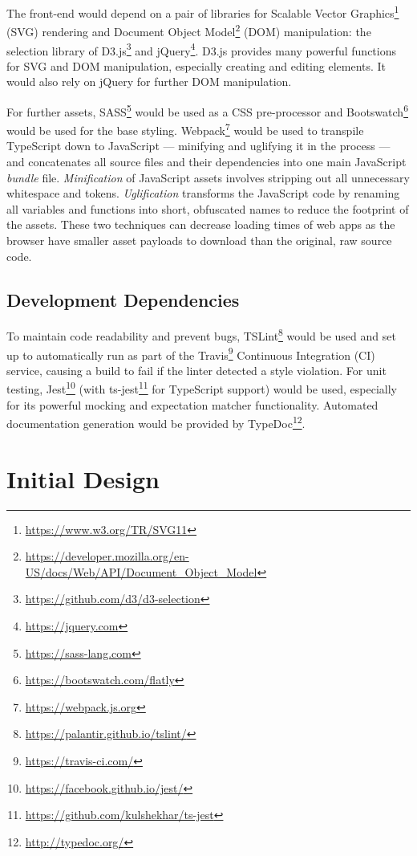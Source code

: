\documentclass[nobib, a4paper, twoside, justified]{tufte-book}
\newcommand{\footnoteurl}[1]{\footnote{\url{#1}}}
\begin{document}
The front-end would depend on a pair of libraries for Scalable Vector
Graphics\footnoteurl{https://www.w3.org/TR/SVG11} (SVG) rendering and Document Object
Model\footnoteurl{https://developer.mozilla.org/en-US/docs/Web/API/Document_Object_Model} (DOM)
manipulation: the selection library of D3.js\footnoteurl{https://github.com/d3/d3-selection} and
jQuery\footnoteurl{https://jquery.com}. D3.js provides many powerful functions for SVG and DOM
manipulation, especially creating and editing elements. It would also rely on jQuery for further
DOM manipulation.

For further assets, SASS\footnoteurl{https://sass-lang.com} would be used as a CSS pre-processor
and Bootswatch\footnoteurl{https://bootswatch.com/flatly} would be used for the base styling.
Webpack\footnoteurl{https://webpack.js.org} would be used to transpile TypeScript down to
JavaScript --- minifying and uglifying it in the process --- and concatenates all source files and
their dependencies into one main JavaScript \textit{bundle} file. \textit{Minification} of
JavaScript assets involves stripping out all unnecessary whitespace and tokens.
\textit{Uglification} transforms the JavaScript code by renaming all variables and functions into
short, obfuscated names to reduce the footprint of the assets. These two techniques can decrease
loading times of web apps as the browser have smaller asset payloads to download than the original,
raw source code.

\subsection{Development Dependencies}%
\label{sub:development_dependencies}

To maintain code readability and prevent bugs,
TSLint\footnoteurl{https://palantir.github.io/tslint/} would be used and set up to automatically
run as part of the Travis\footnoteurl{https://travis-ci.com/} Continuous Integration (CI) service,
causing a build to fail if the linter detected a style violation. For unit testing,
Jest\footnoteurl{https://facebook.github.io/jest/} (with
ts-jest\footnoteurl{https://github.com/kulshekhar/ts-jest} for TypeScript support) would be used,
especially for its powerful mocking and expectation matcher functionality. Automated documentation
generation would be provided by TypeDoc\footnoteurl{http://typedoc.org/}.

\section{Initial Design}%
\label{sec:initial_design}
\end{document}
